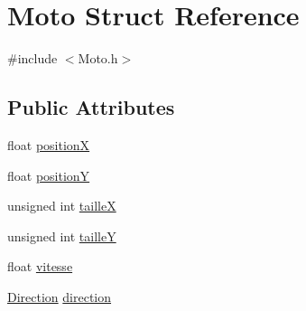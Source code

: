 \hypertarget{structMoto}{\section{Moto Struct Reference}
\label{structMoto}
}


{\ttfamily \#include $<$Moto.\-h$>$}

\subsection*{Public Attributes}
\begin{DoxyCompactItemize}
\item 
float \hyperlink{structMoto_a7d9695eb69a7161d1a6800e4b8bc4170}{position\-X}
\item 
float \hyperlink{structMoto_a68859bbff76786aedccab8093a9de5a8}{position\-Y}
\item 
unsigned int \hyperlink{structMoto_a15d1b56209aba6ea0bc8eeaac82ae625}{taille\-X}
\item 
unsigned int \hyperlink{structMoto_ab7b358839b7d20f16a4a17e5eabad5a4}{taille\-Y}
\item 
float \hyperlink{structMoto_a561dfc3e54a534dfa92ccecbea8dbe71}{vitesse}
\item 
\hyperlink{Moto_8h_a224b9163917ac32fc95a60d8c1eec3aa}{Direction} \hyperlink{structMoto_ace42f991dc2d223029ca7f7162a10e9b}{direction}
\end{DoxyCompactItemize}


